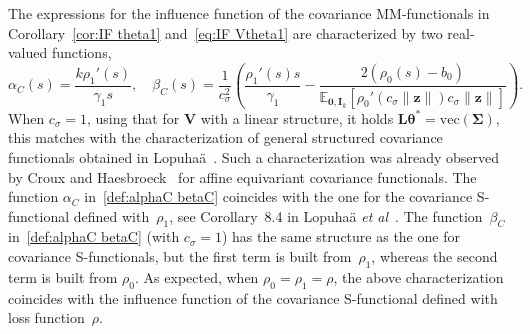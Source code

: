 \documentclass{article}
\numberwithin{equation}{section}
\theoremstyle{plain}
\newcommand{\vc}{\mathrm{vec}}
\newcommand{\btheta}{\bm\theta}
\newcommand{\bSigma}{\mathbf{\Sigma}}
\newcommand{\bz}{\mathbf{z}}
\newcommand{\bV}{\mathbf{V}}
\newcommand{\bI}{\mathbf{I}}
\newcommand{\bL}{\mathbf{L}}
\newcommand{\E}{\mathbb{E}}
\begin{document}
The expressions for the influence function of the covariance MM-functionals in Corollary~\ref{cor:IF theta1} and~\eqref{eq:IF Vtheta1}
are characterized by two real-valued functions,
\begin{equation}
\label{def:alphaC betaC}
\alpha_C(s)=\frac{k\rho_1'(s)}{\gamma_1s},
\quad
\beta_C(s)=
\frac{1}{c_\sigma^2}
\left(
\frac{\rho_1'(s)s}{\gamma_1}
-
\frac{2(\rho_0(s)-b_0)}{\E_{\mathbf{0},\bI_k}
\left[
\rho_0'(c_\sigma\|\bz\|)c_\sigma\|\bz\|
\right]}
\right).
\end{equation}
When $c_\sigma=1$, using that for $\bV$ with a linear structure, it holds $\bL\btheta^*=\vc(\bSigma)$,
this matches with the characterization of general structured covariance functionals obtained in Lopuha\"a~\cite{lopuhaa2025}. 
Such a characterization was already observed by Croux and Haesbroeck~\cite{croux-haesbroeck2000} for affine equivariant covariance functionals.
The function $\alpha_C$ in~\eqref{def:alphaC betaC} coincides with the one for the covariance S-functional defined with~$\rho_1$,
see Corollary~8.4 in Lopuha\"a \emph{et al}~\cite{lopuhaa-gares-ruizgazen2023}.
The function~$\beta_C$ in~\eqref{def:alphaC betaC} (with $c_\sigma=1$) has the same structure as the one for covariance S-functionals,
but the first term is built from~$\rho_1$, whereas the second term is built from $\rho_0$.
As expected, when $\rho_0=\rho_1=\rho$, the above characterization coincides with the 
influence function of the covariance S-functional defined with loss function~$\rho$.
\end{document}
